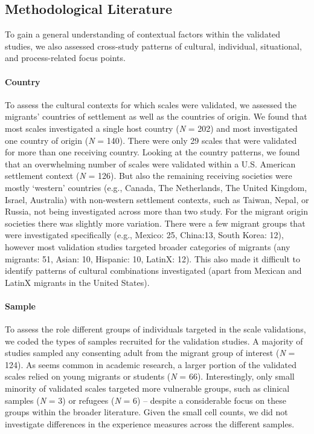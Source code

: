 \subsection{Methodological Literature}

To gain a general understanding of contextual factors within the
validated studies, we also assessed cross-study patterns of cultural,
individual, situational, and process-related focus points.

\paragraph{Country}

To assess the cultural contexts for which scales were validated, we
assessed the migrants' countries of settlement as well as the countries
of origin. We found that most scales investigated a single host country
(\textit{N} = 202) and most investigated one country of origin
(\textit{N} = 140). There were only 29 scales that were validated for
more than one receiving country. Looking at the country patterns, we
found that an overwhelming number of scales were validated within a U.S.
American settlement context (\textit{N} = 126). But also the remaining
receiving societies were mostly `western' countries (e.g., Canada, The
Netherlands, The United Kingdom, Israel, Australia) with non-western
settlement contexts, such as Taiwan, Nepal, or Russia, not being
investigated across more than two study. For the migrant origin
societies there was slightly more variation. There were a few migrant
groups that were investigated specifically (e.g., Mexico: 25, China:13,
South Korea: 12), however most validation studies targeted broader
categories of migrants (any migrants: 51, Asian: 10, Hispanic: 10,
LatinX: 12). This also made it difficult to identify patterns of
cultural combinations investigated (apart from Mexican and LatinX
migrants in the United States).

\paragraph{Sample}

To assess the role different groups of individuals targeted in the scale
validations, we coded the types of samples recruited for the validation
studies. A majority of studies sampled any consenting adult from the
migrant group of interest (\textit{N} = 124). As seems common in
academic research, a larger portion of the validated scales relied on
young migrants or students (\textit{N} = 66). Interestingly, only small
minority of validated scales targeted more vulnerable groups, such as
clinical samples (\textit{N} = 3) or refugees (\textit{N} = 6) --
despite a considerable focus on these groups within the broader
literature. Given the small cell counts, we did not investigate
differences in the experience measures across the different samples.

